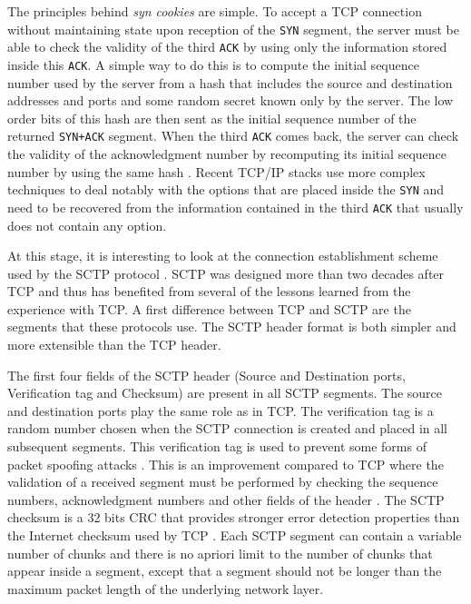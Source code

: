 The principles behind \emph{syn cookies} are simple. To accept a TCP connection without maintaining state upon reception of the \texttt{SYN} segment, the server must be able to check the validity of the third \texttt{ACK} by using only the information stored inside this \texttt{ACK}. A simple way to do this is to compute the initial sequence number used by the server from a hash that includes the source and destination addresses and ports and some random secret known only by the server. The low order bits of this hash are then sent as the initial sequence number of the returned \texttt{SYN+ACK} segment. When the third \texttt{ACK} comes back, the server can check the validity of the acknowledgment number by recomputing its initial sequence number by using the same hash \cite{rfc4987}. Recent TCP/IP stacks use more complex techniques to deal notably with the options that are placed inside the \texttt{SYN} and need to be recovered from the information contained in the third \texttt{ACK} that usually does not contain any option.

At this stage, it is interesting to look at the connection establishment scheme used by the SCTP protocol \cite{rfc4960}. SCTP was designed more than two decades after TCP and thus has benefited from several of the lessons learned from the experience with TCP. A first difference between TCP and SCTP are the segments that these protocols use. The SCTP header format is both simpler and more extensible than the TCP header. 

The first four fields of the SCTP header (Source and Destination ports, Verification tag and Checksum) are present in all SCTP segments. The source and destination ports play the same role as in TCP. The verification tag is a random number chosen when the SCTP connection is created and placed in all subsequent segments. This verification tag is used to prevent some forms of packet spoofing attacks \cite{rfc4960}. This is an improvement compared to TCP where the validation of a received segment must be performed by checking the sequence numbers, acknowledgment numbers and other fields of the header \cite{Gont_TCPSecurity:2012}. The SCTP checksum is a 32 bits CRC that provides stronger error detection properties than the Internet checksum used by TCP \cite{Stone:2000:CTC:347059.347561}. Each SCTP segment can contain a variable number of chunks and there is no apriori limit to the number of chunks that appear inside a segment, except that a segment should not be longer than the maximum packet length of the underlying network layer.

